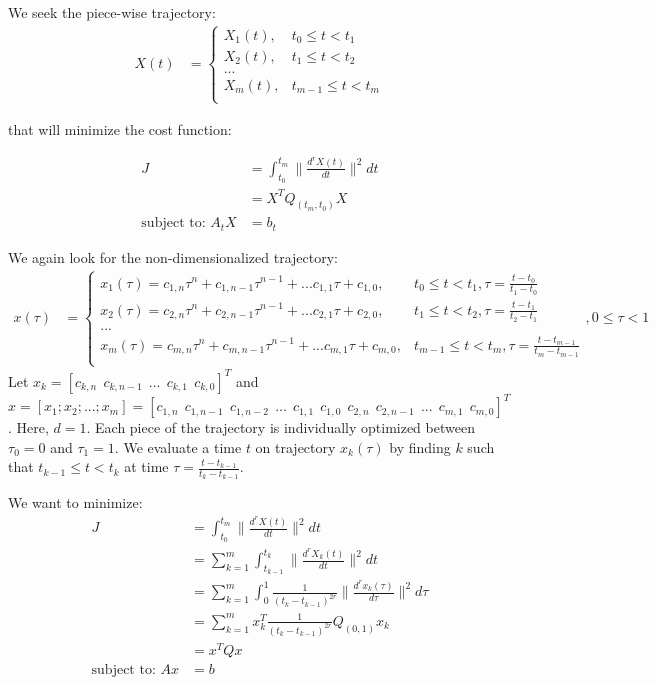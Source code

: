 \documentclass[11pt]{article}
\begin{document}
\mbox{} \newline
We seek the piece-wise trajectory: 
\begin{align*}
X(t) &= 
\begin{cases}
    X_1 (t), & t_0 \le t < t_1 \\
    X_2 (t), & t_1 \le t < t_2 \\
    ... \\
    X_m (t), & t_{m-1} \le t < t_m \\
\end{cases}
\end{align*} 

that will minimize the cost function:

\begin{align*}
J &= \int_{t_0}^{t_m} \|  \frac{d^{r} X(t) }{dt} \|^2 dt \\
&= X^T Q_{(t_m, t_0)} X \\
\text{subject to: } A_t X &=b_t
\end{align*}

We again look for the non-dimensionalized trajectory: 
\begin{align*}
x(\tau) &= 
\begin{cases}
    x_1 (\tau) = c_{1, n} \tau^n + c_{1, n-1} \tau^{n-1} + ... c_{1, 1} \tau + c_{1, 0}, & t_0 \le t < t_1, \tau = \frac{t-t_0}{t_1-t_0}  \\
    x_2 (\tau) = c_{2, n} \tau^n + c_{2, n-1} \tau^{n-1} + ... c_{2, 1} \tau + c_{2, 0}, & t_1 \le t < t_2, \tau = \frac{t-t_1}{t_2-t_1}  \\
    ... \\
    x_m (\tau) = c_{m, n} \tau^n + c_{m, n-1} \tau^{n-1} + ... c_{m, 1} \tau + c_{m, 0}, & t_{m-1} \le t < t_m, \tau = \frac{t-t_{m-1}}{t_m-t_{m-1}} \\
\end{cases},  0 \le \tau < 1
\end{align*} 
Let $x_k = [c_{k, n} \ \ c_{k, n-1} \ \ ... \ \ c_{k, 1} \ \ c_{k, 0}]^T$ and $x = [x_1; x_2; ...; x_m] = [c_{1, n} \ \ c_{1, n-1} \ \ c_{1, n-2} \ \ ... \ \ c_{1, 1} \ \ c_{1, 0} \ \ c_{2, n} \ \ c_{2, n-1} \ \ ... \ \ c_{m, 1} \ \ c_{m, 0} ]^T$. Here, $d = 1$. Each piece of the trajectory is individually optimized between $\tau_0 = 0$ and $\tau_1=1$. We evaluate a time $t$ on trajectory $x_k(\tau)$ by finding $k$ such that $t_{k-1} \le t < t_k$ at time $\tau = \frac{t-t_{k-1}}{t_k-t_{k-1}}$.  

\mbox{} \newline
We want to minimize:
\begin{align*}
J &= \int_{t_0}^{t_m} \|  \frac{d^{r} X(t) }{dt} \|^2 dt \\
&= \sum_{k=1}^{m} \int_{t_{k-1}}^{t_k} \|  \frac{d^{r} X_k (t) }{dt} \|^2 dt  \\
&= \sum_{k=1}^{m} \int_{0}^{1} \frac{1}{(t_k-t_{k-1})^{2r}} \|  \frac{d^{r} x_k (\tau) }{d\tau} \|^2 d\tau  \\
&=  \sum_{k=1}^{m} x_k^T \frac{1}{(t_k-t_{k-1})^{2r}} Q_{(0, 1)} x_k \\
&= x^T Q x \\
\text{subject to: } A x &=b
\end{align*}
\end{document}
